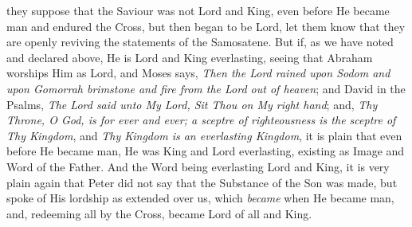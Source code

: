 they suppose that the Saviour was not Lord and King, even before He
became man and endured the Cross, but then began to be Lord, let them
know that they are openly reviving the statements of the Samosatene.
But if, as we have noted and declared above, He is Lord and King
everlasting, seeing that Abraham worships Him as Lord, and Moses says,
\emph{Then the Lord rained upon Sodom and upon Gomorrah brimstone and
fire from the Lord out of heaven}; and David in the Psalms, \emph{The
Lord said unto My Lord, Sit Thou on My right hand}; and, \emph{Thy
Throne, O God, is for ever and ever; a sceptre of righteousness is the
sceptre of Thy Kingdom}, and \emph{Thy Kingdom is an everlasting
Kingdom}, it is plain that even before He became man, He was King
and Lord everlasting, existing as Image and Word of the Father. And
the Word being everlasting Lord and King, it is very plain again that
Peter did not say that the Substance of the Son was made, but spoke of
His lordship as extended over us, which \emph{became} when He became
man, and, redeeming all by the Cross, became Lord of all and King.

